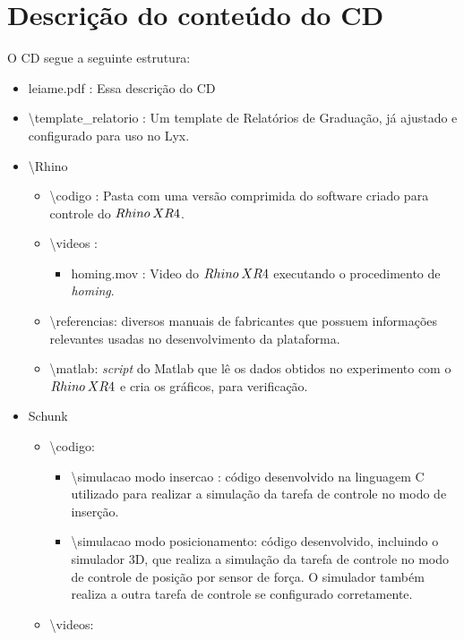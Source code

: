 


\chapter{Descrição do conteúdo do CD}

\label{AnCD} 

O CD segue a seguinte estrutura:
\begin{itemize}
\item leiame.pdf : Essa descrição do CD
\item \textbackslash{}template\_relatorio : Um template de Relatórios de
Graduação, já ajustado e configurado para uso no Lyx.
\item \textbackslash{}Rhino

\begin{itemize}
\item \textbackslash{}codigo : Pasta com uma versão comprimida do software
criado para controle do $Rhino\: XR4$.
\item \textbackslash{}videos :

\begin{itemize}
\item homing.mov : Video do $Rhino\: XR4$ executando o procedimento de \textit{homing}.
\end{itemize}
\item \textbackslash{}referencias: diversos manuais de fabricantes que possuem
informações relevantes usadas no desenvolvimento da plataforma.
\item \textbackslash{}matlab: \textit{script} do Matlab que lê os dados
obtidos no experimento com o $Rhino\: XR4$ e cria os gráficos, para verificação.
\end{itemize}
\item Schunk

\begin{itemize}
\item \textbackslash{}codigo:

\begin{itemize}
\item \textbackslash{}simulacao modo insercao : código desenvolvido na linguagem
C utilizado para realizar a simulação da tarefa de controle no modo
de inserção.
\item \textbackslash{}simulacao modo posicionamento: código desenvolvido,
incluindo o simulador 3D, que realiza a simulação da tarefa de controle
no modo de controle de posição por sensor de força. O simulador também
realiza a outra tarefa de controle se configurado corretamente.
\end{itemize}
\item \textbackslash{}videos:


\end{itemize}
\end{itemize}
